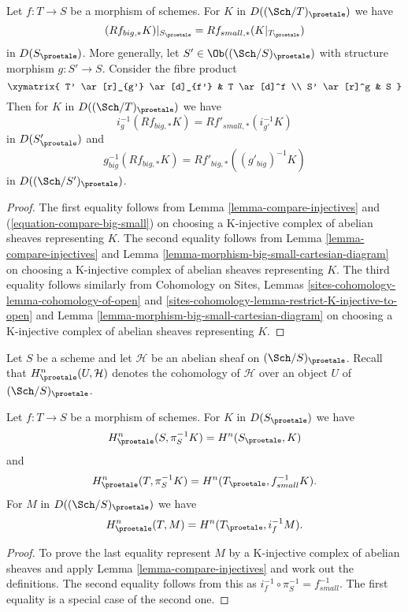 \begin{lemma}
\label{lemma-compare-higher-direct-image}
Let $f : T \to S$ be a morphism of schemes.
For $K$ in $D((\Sch/T)_\proetale)$ we have
$$
(Rf_{big, *}K)|_{S_\proetale} = Rf_{small, *}(K|_{T_\proetale})
$$
in $D(S_\proetale)$. More generally, let $S' \in \Ob((\Sch/S)_\proetale)$
with structure morphism $g : S' \to S$. Consider the fibre product
$$
\xymatrix{
T' \ar[r]_{g'} \ar[d]_{f'} & T \ar[d]^f \\
S' \ar[r]^g & S
}
$$
Then for $K$ in $D((\Sch/T)_\proetale)$ we have
$$
i_g^{-1}(Rf_{big, *}K) = Rf'_{small, *}(i_{g'}^{-1}K)
$$
in $D(S'_\proetale)$ and
$$
g_{big}^{-1}(Rf_{big, *}K) = Rf'_{big, *}((g'_{big})^{-1}K)
$$
in $D((\Sch/S')_\proetale)$.
\end{lemma}

\begin{proof}
The first equality follows from Lemma \ref{lemma-compare-injectives}
and (\ref{equation-compare-big-small})
on choosing a K-injective complex of abelian sheaves representing $K$.
The second equality follows from Lemma \ref{lemma-compare-injectives}
and Lemma
\ref{lemma-morphism-big-small-cartesian-diagram}
on choosing a K-injective complex of abelian sheaves representing $K$.
The third equality follows similarly from
Cohomology on Sites, Lemmas \ref{sites-cohomology-lemma-cohomology-of-open} and
\ref{sites-cohomology-lemma-restrict-K-injective-to-open}
and Lemma \ref{lemma-morphism-big-small-cartesian-diagram}
on choosing a K-injective complex of abelian sheaves representing $K$.
\end{proof}

\noindent
Let $S$ be a scheme and let $\mathcal{H}$ be an abelian sheaf on
$(\Sch/S)_\proetale$. Recall that $H^n_\proetale(U, \mathcal{H})$ denotes
the cohomology of $\mathcal{H}$ over an object $U$ of $(\Sch/S)_\proetale$.

\begin{lemma}
\label{lemma-compare-cohomology-big-small}
Let $f : T \to S$ be a morphism of schemes. For $K$ in $D(S_\proetale)$
we have
$$
H^n_\proetale(S, \pi_S^{-1}K) = H^n(S_\proetale, K)
$$
and
$$
H^n_\proetale(T, \pi_S^{-1}K) = H^n(T_\proetale, f_{small}^{-1}K).
$$
For $M$ in $D((\Sch/S)_\proetale)$ we have
$$
H^n_\proetale(T, M) = H^n(T_\proetale, i_f^{-1}M).
$$
\end{lemma}

\begin{proof}
To prove the last equality represent $M$
by a K-injective complex of abelian sheaves
and apply Lemma \ref{lemma-compare-injectives}
and work out the definitions. The second equality follows from
this as $i_f^{-1} \circ \pi_S^{-1} = f_{small}^{-1}$. The first
equality is a special
case of the second one.
\end{proof}


